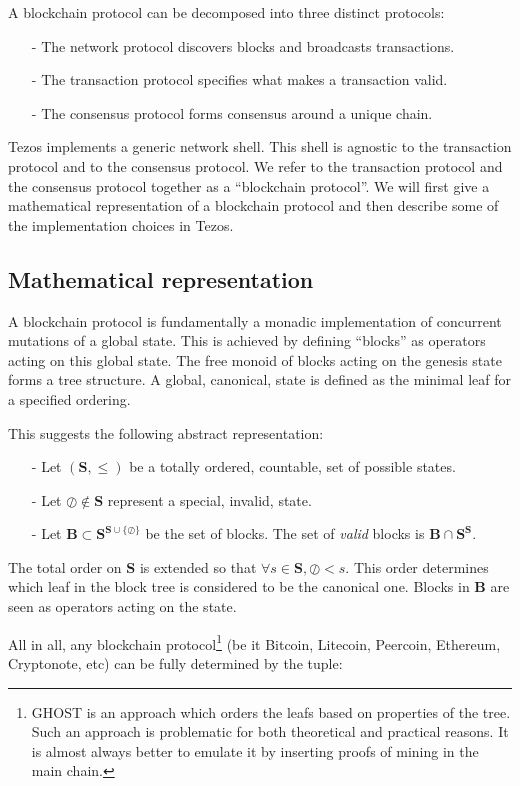 \documentclass[letterpaper]{article}
\begin{document}
A blockchain protocol can be decomposed into three distinct protocols:
\begin{itemize}
\item[-] The network protocol discovers blocks and broadcasts transactions.
\item[-] The transaction protocol specifies what makes a transaction valid.
\item[-] The consensus protocol forms consensus around a unique chain.
\end{itemize}

Tezos implements a generic network shell. This shell is agnostic to the
transaction protocol and to the consensus protocol. We refer to the transaction
protocol and the consensus protocol together as a ``blockchain protocol''. We
will first give a mathematical representation of a blockchain protocol and then
describe some of the implementation choices
in Tezos.

\subsection{Mathematical representation}

A blockchain protocol is fundamentally a monadic implementation of concurrent
mutations of a global state. This is achieved by defining ``blocks'' as
operators acting on this global state. The free monoid of blocks acting on the
genesis state forms a tree structure. A global, canonical, state is defined as
the minimal leaf for a specified ordering.

This suggests the following abstract representation:

\begin{itemize}
\item[-]Let $(\mathbf{S},\leq)$ be a totally ordered, countable, set of possible
states.
\item[-]Let $\oslash \notin \mathbf{S}$ represent a special, invalid, state.
\item[-]Let $\mathbf{B} \subset \mathbf{S}^{\mathbf{S} \cup \{\oslash\}}$ be the
set of blocks. The set of \emph{valid} blocks is
$\mathbf{B} \cap \mathbf{S}^{\mathbf{S}}$.
\end{itemize}

The total order on $\mathbf{S}$ is extended so that
$\forall s \in \mathbf{S}, \oslash < s$.
This order determines which leaf in the block tree is considered to be the
canonical one. Blocks in $\mathbf{B}$ are seen as operators acting on the state.

All in all, any blockchain protocol\footnote{GHOST is an approach which orders
the leafs based on properties of the tree. Such an approach is problematic for
both theoretical and practical reasons. It is almost always better to emulate it
by inserting proofs of mining in the main chain.} (be it Bitcoin, Litecoin,
Peercoin, Ethereum, Cryptonote, etc) can be fully determined by the tuple:
\end{document}
